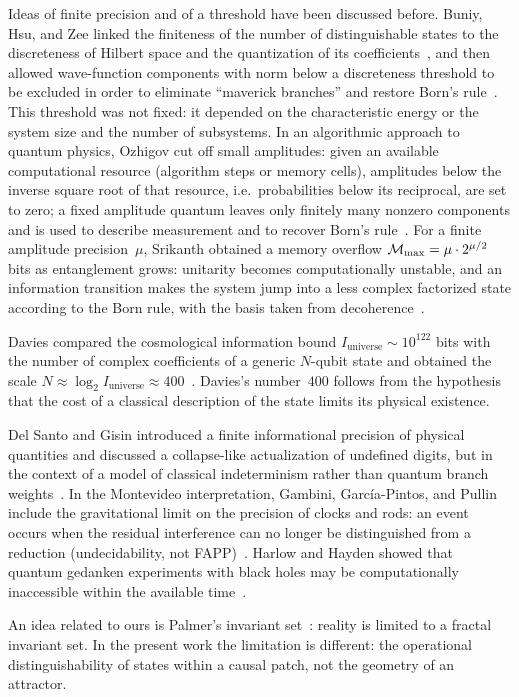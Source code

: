 \documentclass[11pt,a4paper]{article}
\begin{document}
Ideas of finite precision and of a threshold have been discussed before. Buniy, Hsu, and Zee linked the finiteness of the number of distinguishable states to the discreteness of Hilbert space and the quantization of its coefficients~\cite{buniy2005}, and then allowed wave-function components with norm below a discreteness threshold to be excluded in order to eliminate ``maverick branches'' and restore Born's rule~\cite{buniy2006}. This threshold was not fixed: it depended on the characteristic energy or the system size and the number of subsystems. In an algorithmic approach to quantum physics, Ozhigov cut off small amplitudes: given an available computational resource (algorithm steps or memory cells), amplitudes below the inverse square root of that resource, i.e.\ probabilities below its reciprocal, are set to zero; a fixed amplitude quantum leaves only finitely many nonzero components and is used to describe measurement and to recover Born's rule~\cite{ozhigov2004}. For a finite amplitude precision~$\mu$, Srikanth obtained a memory overflow ${\cal M}_{\max}=\mu\cdot 2^{\mu/2}$ bits as entanglement grows: unitarity becomes computationally unstable, and an information transition makes the system jump into a less complex factorized state according to the Born rule, with the basis taken from decoherence~\cite{srikanth2003,srikanth2006}.

Davies compared the cosmological information bound $I_{\mathrm{universe}}\sim10^{122}$ bits with the number of complex coefficients of a generic $N$-qubit state and obtained the scale $N\approx\log_2 I_{\mathrm{universe}}\approx400$~\cite{davies2007}. Davies's number~$400$ follows from the hypothesis that the cost of a classical description of the state limits its physical existence.

Del Santo and Gisin introduced a finite informational precision of physical quantities and discussed a collapse-like actualization of undefined digits, but in the context of a model of classical indeterminism rather than quantum branch weights~\cite{delsanto2019}. In the Montevideo interpretation, Gambini, Garc\'ia-Pintos, and Pullin include the gravitational limit on the precision of clocks and rods: an event occurs when the residual interference can no longer be distinguished from a reduction (undecidability, not FAPP)~\cite{gambini2011}. Harlow and Hayden showed that quantum gedanken experiments with black holes may be computationally inaccessible within the available time~\cite{harlow2013}.

An idea related to ours is Palmer's invariant set~\cite{palmer2009}: reality is limited to a fractal invariant set. In the present work the limitation is different: the operational distinguishability of states within a causal patch, not the geometry of an attractor.
\end{document}
